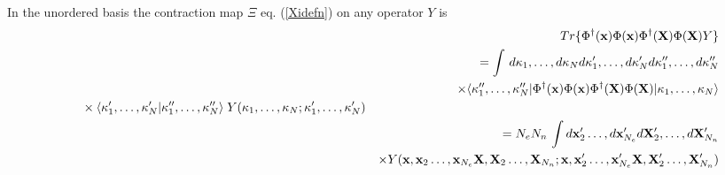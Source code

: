 In the unordered basis the contraction map $\Xi $ eq. (\ref{Xidefn}) on any
operator $Y$ is %
\begin{eqnarray}
&& \!\!\!\!\!Tr\{\Phi ^{\dagger }({\bf x})\Phi ({\bf x})\Phi ^{\dagger }(%
{\bf X})\Phi ({\bf X})Y\}  \nonumber \\
&& =\int \,d\kappa _{1},\ldots ,d\kappa _{N}d\kappa _{1}^{\prime },\ldots
,d\kappa _{N}^{\prime }d\kappa _{1}^{\prime \prime },\ldots ,d\kappa
_{N}^{\prime \prime }  \nonumber \\
&& \qquad \times \langle \kappa _{1}^{\prime \prime },\ldots ,\kappa
_{N}^{\prime \prime }|\Phi ^{\dagger }({\bf x})\Phi ({\bf x})\Phi ^{\dagger
}({\bf X})\Phi ({\bf X})|\kappa _{1},\ldots ,\kappa _{N}\rangle  \nonumber \\
& \qquad \times \langle \kappa _{1}^{\prime },\ldots ,\kappa _{N}^{\prime
}|\kappa _{1}^{\prime \prime },\ldots ,\kappa _{N}^{\prime \prime }\rangle
\;Y(\kappa _{1},\ldots ,\kappa _{N};\kappa _{1}^{\prime },\ldots ,\kappa
_{N}^{\prime })  \nonumber \\
&& =N_{e}N_{n}\,\int d{\bf x}_{2}^{\prime }\ldots ,d{\bf x}_{N_{e}}^{\prime
}d{\bf X}_{2}^{\prime },\ldots ,d{\bf X}_{N_{n}}^{\prime }  \nonumber \\
&& \times Y({\bf x},{\bf x}_{2}\ldots ,{\bf x}_{N_{e}}{\bf X},{\bf X}%
_{2}\ldots ,{\bf X}_{N_{n}};{\bf x},{\bf x}_{2}^{\prime }\ldots ,{\bf x}%
_{N_{e}}^{\prime }{\bf X},{\bf X}_{2}^{\prime }\ldots ,{\bf X}%
_{N_{n}}^{\prime })   \label{TrphiphiphiphiY}
\end{eqnarray}

